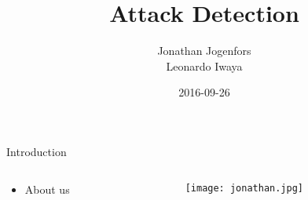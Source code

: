 \documentclass[compress]{beamer}
\title{Attack Detection}
\subtitle{}
\author{Jonathan Jogenfors\\ Leonardo Iwaya}
\date{2016-09-26}
\begin{document}
\small
\frame{\titlepage}
\begin{frame}{Introduction}
    \begin{columns}
        \begin{column}{0.8\textwidth}
    \begin{itemize}
        \item About us
    \end{itemize}
        \end{column}
        \begin{column}{0.2\textwidth}  %
            \begin{center}

                \texttt{[image: jonathan.jpg]}


            \end{center}
        \end{column}
    \end{columns}
\end{frame}
\end{document}
